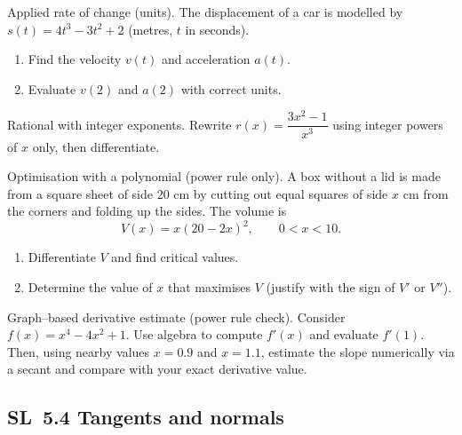 \documentclass[11pt]{article}
\def\textbf#1{#1}%
\newcommand{\tocsubsection}[1]{\subsection{#1}}
\newcounter{question}
\begin{document}
\begin{question}
\textbf{Applied rate of change (units).}
The displacement of a car is modelled by $s(t)=4t^{3}-3t^{2}+2$ (metres, $t$ in seconds).
\begin{enumerate}
  \item Find the velocity $v(t)$ and acceleration $a(t)$.
  \item Evaluate $v(2)$ and $a(2)$ with correct units.
\end{enumerate}
\end{question}

\begin{question}
\textbf{Rational with integer exponents.}
Rewrite $r(x)=\dfrac{3x^{2}-1}{x^{3}}$ using integer powers of $x$ only, then differentiate.
\end{question}

\begin{question}
\textbf{Optimisation with a polynomial (power rule only).}
A box without a lid is made from a square sheet of side $20$ cm by cutting out equal squares of side $x$ cm from the corners and folding up the sides. The volume is
\[
V(x)=x(20-2x)^{2},\qquad 0<x<10.
\]
\begin{enumerate}
  \item Differentiate $V$ and find critical values.
  \item Determine the value of $x$ that maximises $V$ (justify with the sign of $V'$ or $V''$).
\end{enumerate}
\end{question}

\begin{question}
\textbf{Graph–based derivative estimate (power rule check).}
Consider $f(x)=x^{4}-4x^{2}+1$. Use algebra to compute $f'(x)$ and evaluate $f'(1)$. Then, using nearby values $x=0.9$ and $x=1.1$, estimate the slope numerically via a secant and compare with your exact derivative value.
\end{question}





\tocsubsection{SL 5.4 \; Tangents and normals}
\end{document}
